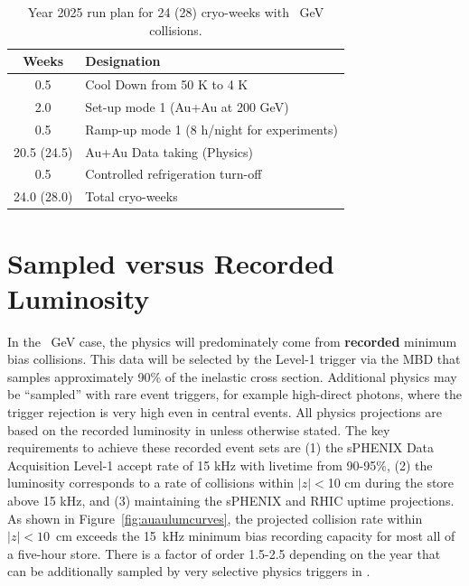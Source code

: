 \begin{table}
\centering
\begin{tabular}{ | c | l | }
\hline
Weeks & Designation \\ \hline
0.5  & Cool Down from 50 K to 4 K \\ \hline
2.0  & Set-up mode 1 (Au+Au at 200 GeV) \\ \hline
0.5  & Ramp-up mode 1 (8 h/night for experiments) \\ \hline
20.5 (24.5) & Au+Au Data taking (Physics) \\ \hline
0.5  & Controlled refrigeration turn-off \\ \hline \hline \hline
24.0 (28.0) & Total cryo-weeks \\
\hline
\end{tabular}
\caption{Year 2025 run plan for 24 (28) cryo-weeks with ~GeV collisions.\label{tab:cryoplan2025}}
\end{table}

\section{Sampled versus Recorded Luminosity}

In the ~GeV case, the physics will predominately come from {\bf recorded} minimum bias collisions.   This data will be selected by the Level-1 trigger via the MBD that samples approximately 90\% of the inelastic cross section.   Additional physics may be ``sampled'' with rare event triggers, for
example high-\pt direct photons, where the trigger rejection is very high even in central \auau events.   All physics projections are based on the recorded luminosity in \auau unless otherwise stated.     
The key requirements to achieve these recorded event sets are (1) the sPHENIX Data Acquisition Level-1 accept rate of 15 kHz with livetime from 90-95\%, (2) the luminosity corresponds to a rate of collisions within $|z|<$10 cm during the store above 15 kHz, and (3) maintaining the sPHENIX and RHIC uptime projections. 
As shown in Figure~\ref{fig:auaulumcurves}, the projected \auau collision rate within $|z|<10$~cm exceeds the 15~kHz minimum bias recording capacity for most all of a five-hour store.   There is a factor of order 1.5-2.5 depending on the year that can be additionally sampled by very selective physics triggers in \auau.

